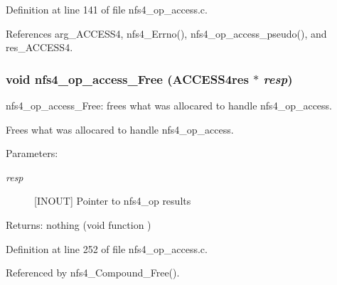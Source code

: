 Definition at line 141 of file nfs4\_\-op\_\-access.c.

References arg\_\-ACCESS4, nfs4\_\-Errno(), nfs4\_\-op\_\-access\_\-pseudo(), and res\_\-ACCESS4.
\subsubsection{\setlength{\rightskip}{0pt plus 5cm}void nfs4\_\-op\_\-access\_\-Free (ACCESS4res $\ast$ {\em resp})}\label{nfs4__op__access_8c_a3}


nfs4\_\-op\_\-access\_\-Free: frees what was allocared to handle nfs4\_\-op\_\-access.

Frees what was allocared to handle nfs4\_\-op\_\-access.

\begin{Desc}
\item[Parameters:]
\begin{description}
\item[{\em resp}][INOUT] Pointer to nfs4\_\-op results\end{description}
\end{Desc}
\begin{Desc}
\item[Returns:]nothing (void function ) \end{Desc}


Definition at line 252 of file nfs4\_\-op\_\-access.c.

Referenced by nfs4\_\-Compound\_\-Free().